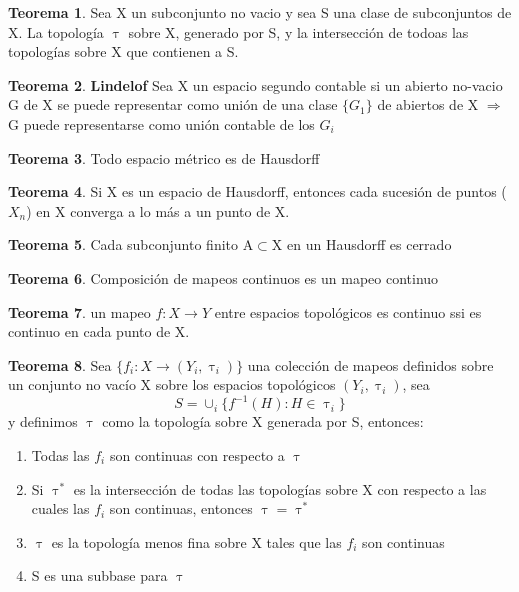 \documentclass{article}
\theoremstyle{definition}
\newtheorem{theorem}{Teorema}[section]
\begin{document}

\begin{theorem}
Sea X un subconjunto no vacio y sea S una clase de subconjuntos de X. La topología $\uptau$ sobre X, generado por S, y la intersección de todoas las topologías sobre X que contienen a S. 
\end{theorem}


\begin{theorem}{\textbf{Lindelof}}
	Sea X un espacio segundo contable si un abierto no-vacio G de X se puede representar como unión de una clase $\{G_1\}$ de abiertos de X $\Rightarrow$ G puede representarse como unión contable de los $G_i$
\end{theorem}


\begin{theorem}
	Todo espacio métrico es de Hausdorff 
\end{theorem}


\begin{theorem}
	Si X es un espacio de Hausdorff, entonces cada sucesión de puntos ($X_n$) en X converga a lo más a un punto de X.
\end{theorem}


\begin{theorem}
	Cada subconjunto finito A$\subset$X en un Hausdorff es cerrado
\end{theorem}


\begin{theorem}
	Composición de mapeos continuos es un mapeo continuo
\end{theorem}


\begin{theorem}
	 un mapeo $f:X\to Y$ entre espacios topológicos es continuo ssi es continuo en cada punto de X.
\end{theorem}


\begin{theorem}
	Sea $\{f_i:X\to(Y_i,\uptau_i)\}$ una colección de mapeos definidos sobre un conjunto no vacío X sobre los espacios topológicos $(Y_i,\uptau_i)$, sea 
	\[S=\cup_i \{f^{-1}(H):H\in\uptau_i\}\]
	y definimos $\uptau$ como la topología sobre X generada por S, entonces:
	\begin{enumerate}
	\item Todas las $f_i$ son continuas con respecto a $\uptau$
	\item Si $\uptau^*$ es la intersección de todas las topologías sobre X con respecto a las cuales las $f_i$ son continuas, entonces $\uptau=\uptau^*$
	\item $\uptau$ es la topología menos fina sobre X tales que las $f_i$ son continuas
	\item S es una subbase para $\uptau$
	\end{enumerate}
\end{theorem}
\end{document}
